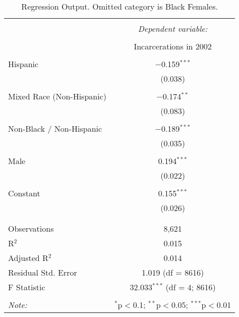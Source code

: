 
\begin{table}[!htbp] \centering 
  \caption{Regression Output. Omitted category is Black Females.} 
  \label{tab:regression} 
\begin{tabular}{@{\extracolsep{5pt}}lc} 
\\[-1.8ex]\hline 
\hline \\[-1.8ex] 
 & \multicolumn{1}{c}{\textit{Dependent variable:}} \\ 
\cline{2-2} 
\\[-1.8ex] & Incarcerations in 2002 \\ 
\hline \\[-1.8ex] 
 Hispanic & $-$0.159$^{***}$ \\ 
  & (0.038) \\ 
  & \\ 
 Mixed Race (Non-Hispanic) & $-$0.174$^{**}$ \\ 
  & (0.083) \\ 
  & \\ 
 Non-Black / Non-Hispanic & $-$0.189$^{***}$ \\ 
  & (0.035) \\ 
  & \\ 
 Male & 0.194$^{***}$ \\ 
  & (0.022) \\ 
  & \\ 
 Constant & 0.155$^{***}$ \\ 
  & (0.026) \\ 
  & \\ 
\hline \\[-1.8ex] 
Observations & 8,621 \\ 
R$^{2}$ & 0.015 \\ 
Adjusted R$^{2}$ & 0.014 \\ 
Residual Std. Error & 1.019 (df = 8616) \\ 
F Statistic & 32.033$^{***}$ (df = 4; 8616) \\ 
\hline 
\hline \\[-1.8ex] 
\textit{Note:}  & \multicolumn{1}{r}{$^{*}$p$<$0.1; $^{**}$p$<$0.05; $^{***}$p$<$0.01} \\ 
\end{tabular} 
\end{table} 
